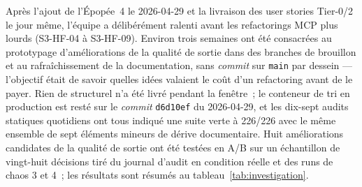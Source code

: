 \documentclass[11pt,a4paper,oneside]{report}
\begin{document}
Après l'ajout de l'Épopée~4 le 2026-04-29 et la livraison des user
stories Tier-0/2 le jour même, l'équipe a délibérément ralenti
avant les refactorings MCP plus lourds (S3-HF-04 à S3-HF-09).
Environ trois semaines ont été consacrées au prototypage
d'améliorations de la qualité de sortie dans des branches de
brouillon et au rafraîchissement de la documentation, sans
\emph{commit} sur \texttt{main} par dessein --- l'objectif était de
savoir quelles idées valaient le coût d'un refactoring avant de le
payer. Rien de structurel n'a été livré pendant la fenêtre~; le
conteneur de tri en production est resté sur le \emph{commit}
\texttt{d6d10ef} du 2026-04-29, et les dix-sept audits statiques
quotidiens ont tous indiqué une suite verte à 226/226 avec le même
ensemble de sept éléments mineurs de dérive documentaire. Huit
améliorations candidates de la qualité de sortie ont été testées en
A/B sur un échantillon de vingt-huit décisions tiré du journal
d'audit en condition réelle et des runs de chaos 3 et 4~; les
résultats sont résumés au tableau~\ref{tab:investigation}.
\end{document}
